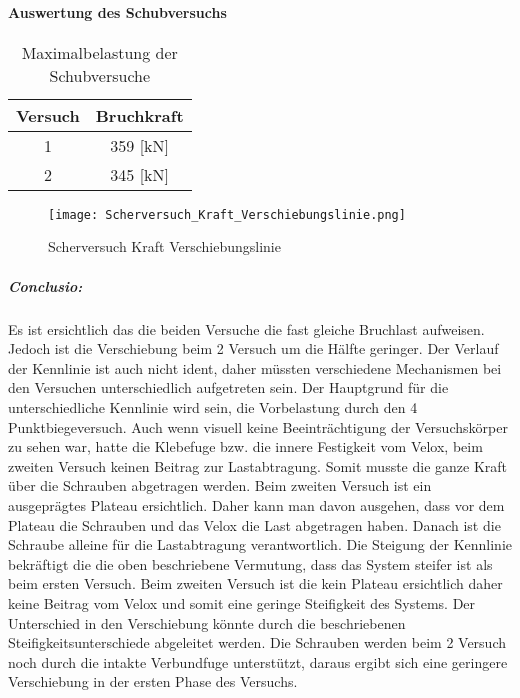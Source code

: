 \documentclass[12 pt,a4 paper ]{scrreprt}
\begin{document}
\paragraph{Auswertung des Schubversuchs}




\begin{table}
\caption{Maximalbelastung der Schubversuche}
\begin{center}

\begin{tabular}{|c|c|}
\hline 
Versuch & Bruchkraft  \\ 
\hline 
1 & 359 [kN] \\ 
\hline 
2 & 345 [kN] \\ 
\hline 
\end{tabular} 


\end{center}
\end{table}




\begin{figure}
\begin{center}
\texttt{[image: Scherversuch\_Kraft\_Verschiebungslinie.png]}
\caption{Scherversuch Kraft Verschiebungslinie}
\label{Scherversuch Kraft Verschiebungslinie}
\end{center}
\end{figure}

\subparagraph{Conclusio:}
Es ist ersichtlich das die beiden Versuche die fast gleiche Bruchlast aufweisen. Jedoch ist die Verschiebung beim 2 Versuch um die Hälfte geringer. Der Verlauf der Kennlinie ist auch nicht ident, daher müssten verschiedene Mechanismen bei den  Versuchen unterschiedlich aufgetreten sein. 
Der Hauptgrund für die unterschiedliche Kennlinie wird sein, die Vorbelastung durch den  4 Punktbiegeversuch. Auch wenn visuell keine Beeinträchtigung der Versuchskörper zu sehen war, hatte die Klebefuge bzw. die innere Festigkeit vom Velox, beim zweiten Versuch keinen Beitrag zur Lastabtragung. Somit musste die ganze Kraft über die Schrauben abgetragen werden.  Beim zweiten Versuch ist ein ausgeprägtes Plateau ersichtlich. Daher kann man davon ausgehen, dass vor dem Plateau die Schrauben und das Velox die Last abgetragen haben. Danach ist die Schraube alleine für die Lastabtragung verantwortlich. Die Steigung der Kennlinie bekräftigt die die oben beschriebene Vermutung, dass das System steifer ist als beim ersten Versuch. Beim zweiten Versuch ist die kein Plateau ersichtlich daher keine Beitrag vom Velox und somit eine geringe Steifigkeit des Systems.
Der Unterschied in den Verschiebung könnte durch die beschriebenen Steifigkeitsunterschiede abgeleitet werden. Die Schrauben werden beim 2 Versuch noch durch die intakte Verbundfuge 
unterstützt, daraus ergibt sich eine geringere Verschiebung in der ersten Phase des Versuchs.
\end{document}
